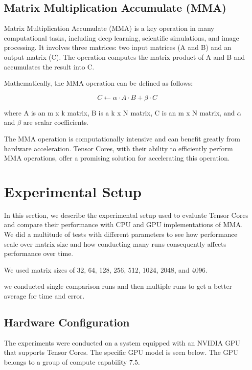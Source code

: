\documentclass[conference]{IEEEtran}
\begin{document}
  \subsection{Matrix Multiplication Accumulate (MMA)}\label{sec:mma}
  
  Matrix Multiplication Accumulate (MMA) is a key operation in many computational tasks, including deep learning, scientific simulations, and image processing. It involves three matrices: two input matrices (A and B) and an output matrix (C). The operation computes the matrix product of A and B and accumulates the result into C.
  
  Mathematically, the MMA operation can be defined as follows:
  
  \[ C \leftarrow \alpha \cdot A \cdot B + \beta \cdot C \]
  
  where A is an m x k matrix, B is a k x N matrix, C is an m x N matrix, and $\alpha$ and $\beta$ are scalar coefficients.
  
  The MMA operation is computationally intensive and can benefit greatly from hardware acceleration. Tensor Cores, with their ability to efficiently perform MMA operations, offer a promising solution for accelerating this operation.
  
  \section{Experimental Setup}\label{sec:experimental-setup}
  
  In this section, we describe the experimental setup used to evaluate 
  Tensor Cores and compare their performance with CPU and GPU implementations of MMA.
  We did a multitude of tests with different parameters to see how performance scale over matrix size
  and how conducting many runs consequently affects performance over time.

  We used matrix sizes of 32, 64, 128, 256, 512, 1024, 2048, and 4096.

  we conducted single comparison runs and then multiple runs to get a better average for time and error.
  
  \subsection{Hardware Configuration}\label{sec:hardware-configuration}
  
  The experiments were conducted on a system equipped with an NVIDIA GPU that supports Tensor Cores.
  The specific GPU model is seen below. The GPU belongs to a group of compute capability 7.5. 
  
\end{document}
